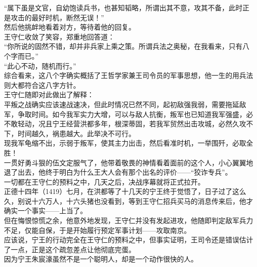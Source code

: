 \begin{multicols}{\theparacolNo}
“属下虽是文官，自幼饱读兵书，也甚知韬略，所谓出其不意，攻其不备，此时正是攻击的最好时机，断然无误！”\\

然后他挑衅地看着对方，等待着他的回复。\\

王守仁收敛了笑容，郑重地回答道：\\

“你所说的固然不错，却并非兵家上乘之策。所谓兵法之奥秘，在我看来，只有八个字而已。”\\

“此心不动，随机而行。”\\

综合看来，这八个字确实概括了王哲学家兼王司令员的军事思想，他一生的用兵法则大都符合这八字方针。\\

王守仁随即对此做出了解释：\\

平叛之战确实应该速战速决，但此时情况已然不同，起初敌强我弱，需要拖延敌军，争取时间。如今我军实力大增，可以与敌人抗衡，叛军也已知道我军强盛，必不敢轻动，况且宁王经营洪都多年，根深蒂固，若我军贸然出击攻城，必然久攻不下，时间越久，祸患越大。此举决不可行。\\

现我军龟缩不出，示弱于叛军，使其主力出击，然后看准时机，一举围歼，必取全胜！\\

一贯好勇斗狠的伍文定服气了，他带着敬畏的神情看着面前的这个人，小心翼翼地退了出去，他终于明白为什么王大人会有那个出名的评价——“狡诈专兵”。\\

一切都在王守仁的预料之中，几天之后，决战序幕就将正式拉开。\\

正德十四年（1419）七月，在洪都等了十几天的宁王终于觉悟了，日子过了这么久，别说十六万人，十六头猪也没看到，等到王守仁招兵买马的消息传来后，他才确实一个事实——上当了。\\

但在悔恨惊慌之余，他意外地发现，王守仁并没有发起进攻，他随即判定敌军兵力不足，仅能自保，于是开始履行预定军事计划——攻取南京。\\

应该说，宁王的行动完全在王守仁的预料之中，但事实证明，王司令还是错误估计了一点，正是这个疏忽差点让他彻底完蛋。\\

因为宁王朱宸濠虽然不是一个聪明人，却是一个动作很快的人。\\


\end{multicols}
